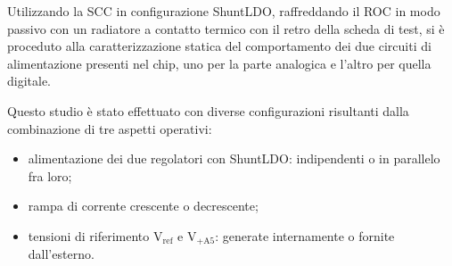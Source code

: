 Utilizzando la SCC in configurazione ShuntLDO, raffreddando il ROC in modo passivo con un radiatore a contatto termico con il retro della scheda di test, si è proceduto alla caratterizzazione statica del comportamento dei due circuiti di alimentazione presenti nel chip, uno per la parte analogica e l'altro per quella digitale. 

Questo studio è stato effettuato con diverse configurazioni risultanti dalla combinazione di tre aspetti operativi:
\begin{itemize}
  \item alimentazione dei due regolatori con ShuntLDO: indipendenti o in parallelo fra loro;
  \item rampa di corrente crescente o decrescente;
  \item tensioni di riferimento $\mathrm{V_{ref}}$ e $\mathrm{V_{+A5}}$: generate internamente o fornite dall'esterno.
\end{itemize}

